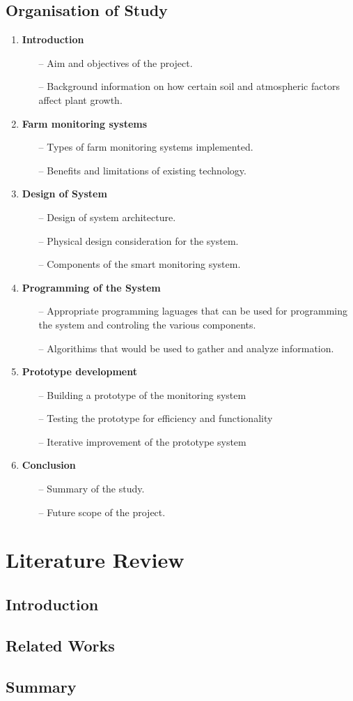 \documentclass[12pt, a4paper]{article}
\begin{document}
\subsection{Organisation of Study}
\begin{enumerate}
\item \textbf{Introduction}
	\begin{itemize}
	\item[--] Aim and objectives of the project.
	\item[--] Background information on how certain soil and atmospheric factors affect plant    growth.
	\end{itemize}
\item \textbf{Farm monitoring systems}
\begin{itemize}
    \item[--] Types of farm monitoring systems implemented.
	\item[--] Benefits and limitations of existing technology.
\end{itemize}
\item \textbf{Design of System}
\begin{itemize}
	\item[--] Design of system architecture.
    \item[--] Physical design consideration for the system.
    \item[--] Components of the smart monitoring system.
\end{itemize}
\item \textbf{Programming of the System}
\begin{itemize}
	\item[--] Appropriate programming laguages that can be used for programming the system and controling the various components.
	\item[--] Algorithims that would be used to gather and analyze information.
\end{itemize}
\item \textbf{Prototype development}
\begin{itemize}
\item[--] Building a prototype of the monitoring system
\item[--] Testing the prototype for efficiency and functionality
\item[--] Iterative improvement of the prototype system
\end{itemize}
\item \textbf{Conclusion}
\begin{itemize}
	\item[--] Summary of the study.
	\item[--] Future scope of the project.
\end{itemize}
\end{enumerate}
\newpage

\section{Literature Review}
\subsection{Introduction}
\subsection{Related Works}
\subsection{Summary}
\end{document}
